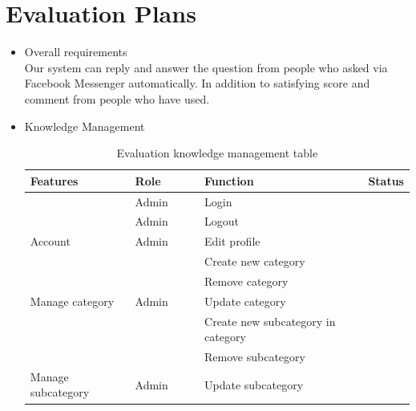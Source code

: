 \documentclass[12pt,oneside,openright,a4paper]{cpe-english-project}
\begin{document}
\section{Evaluation Plans}
\begin{itemize}
  \item Overall requirements\\
Our system can reply and answer the question from people who asked via Facebook Messenger automatically. In addition to satisfying score and comment from people who have used.

  \item Knowledge Management
\begin{table}[h]
	\caption{Evaluation knowledge management table}
	\label{tab:Evaluation knowledge management table}
\begin{adjustbox}{width=\textwidth}
\begin{tabular}{|p{0.3\linewidth}|p{0.2\linewidth}|p{0.5\linewidth}|p{0.1\linewidth}|}
\hline
\rowcolor[HTML]{C9DAF8} 
Features                             & Role                    & Function                           & Status \\ \hline
                                     & Admin                   & Login                              &        \\ \cline{2-4} 
                                     & Admin                   & Logout                             &        \\ \cline{2-4} 
\multirow{-3}{*}{Account}            & Admin                   & Edit profile                       &        \\ \hline
                                     &                         & Create new category                &        \\ \cline{3-4} 
                                     &                         & Remove category                    &        \\ \cline{3-4} 
\multirow{-3}{*}{Manage category}    & \multirow{-3}{*}{Admin} & Update category                    &        \\ \hline
                                     &                         & Create new subcategory in category &        \\ \cline{3-4} 
                                     &                         & Remove subcategory                 &        \\ \cline{3-4} 
\multirow{-3}{*}{Manage subcategory} & \multirow{-3}{*}{Admin} & Update subcategory                 &        \\ \hline

\end{tabular}
\end{adjustbox}
\end{table}
\end{itemize}
\end{document}
